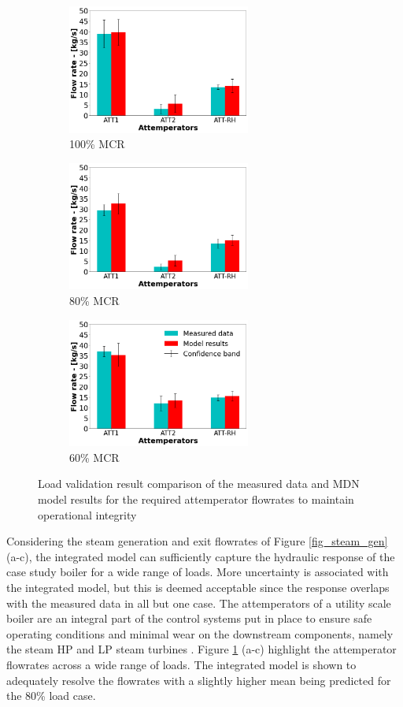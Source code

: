 \documentclass[a4paper,fleqn]{cas-sc}
\begin{document}
\begin{figure}[h!]
\centering
\begin{subfigure}{0.33\textwidth}
    \includegraphics[width=\linewidth, height = 4.25cm]{100_CASE_ATTEMP}
    \caption{100\% MCR}
\end{subfigure}\hfill %
\begin{subfigure}{0.33\textwidth}
    \includegraphics[width=\linewidth, height = 4.25cm]{80_CASE_ATTEMP}
    \caption{80\% MCR}
\end{subfigure}\hfill
\begin{subfigure}{0.33\textwidth}
    \includegraphics[width=\linewidth, height = 4.25cm]{60_CASE_ATTEMP}
    \caption{60\% MCR}
\end{subfigure}
\caption{Load validation result comparison of the measured data and MDN model results for the required attemperator flowrates to maintain operational integrity}
\label{fig_attemp}
\end{figure}


Considering the steam generation and exit flowrates of Figure \ref{fig_steam_gen} (a-c), the integrated model can sufficiently capture the hydraulic response of the case study boiler for a wide range of loads. More uncertainty is associated with the integrated model, but this is deemed acceptable since the response overlaps with the measured data in all but one case. The attemperators of a utility scale boiler are an integral part of the control systems put in place to ensure safe operating conditions and minimal wear on the downstream components, namely the steam HP and LP steam turbines \cite{Kakac1991}. Figure  \ref{fig_attemp} (a-c) highlight the attemperator flowrates across a wide range of loads. The integrated model is shown to adequately resolve the flowrates with a slightly higher mean being predicted for the 80\% load case.\\
\end{document}
